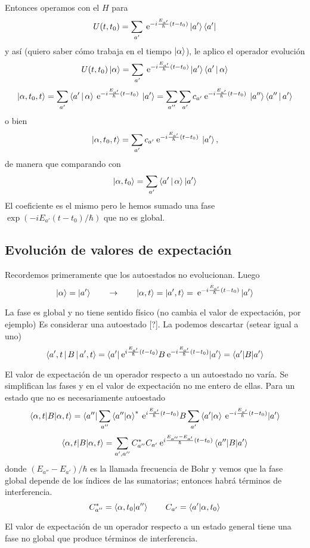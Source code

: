 \documentclass[10pt,oneside]{CBFT_book}
\begin{document}
Entonces operamos con el $H$ para 
\[
	U(t,t_0) = \sum_{a'} \:\mathrm{e}^{-i\frac{E_{a'}}{\hbar}(t-t_0)}\Ket{a'}\Bra{a'}
\]
y así (quiero saber cómo trabaja en el tiempo $\Ket{\alpha}$), le aplico el operador
evolución
\[
	U(t,t_0)\Ket{\alpha} = \sum_{a'} 
	\:\mathrm{e}^{-i\frac{E_{a'}}{\hbar}(t-t_0)}\Ket{a'}\Braket{a'|\alpha}
\]
\[
	\Ket{\alpha,t_0,t} = \sum_{a'} \Braket{a'|\alpha}
	\:\mathrm{e}^{-i\frac{E_{a'}}{\hbar}(t-t_0)} \: \Ket{a'} =
	\sum_{a''} \sum_{a'} c_{a'} \:\mathrm{e}^{-i\frac{E_{a'}}{\hbar}(t-t_0)} \: 
	\Ket{a''}\Braket{a''|a'}
\]
o bien
\[
	\Ket{\alpha,t_0,t} = \sum_{a'} 
	c_{a'} \:\mathrm{e}^{-i\frac{E_{a'}}{\hbar}(t-t_0)} \: \Ket{a'},
\]
de manera que comparando con 
\[
	\Ket{\alpha,t_0} = \sum_{a'} \Braket{a'|\alpha} \Ket{a'}
\]
El coeficiente es el mismo pero le hemos sumado una fase 
$\exp(-iE_{a'}(t-t_0)/\hbar)$ que no es global.

\subsection{Evolución de valores de expectación}

Recordemos primeramente que los autoestados no evolucionan. Luego 
\[
	\Ket{\alpha} = \Ket{a'} 
	\qquad \to \qquad 
	\Ket{\alpha,t} = \Ket{a',t} =  
	\:\mathrm{e}^{-i\frac{E_{a'}}{\hbar}(t-t_0)} \Ket{a'}
\]

La fase es global y no tiene sentido físico (no cambia el valor de expectación, por ejemplo)
Es considerar una autoestado [?]. La podemos descartar (setear igual a uno)
\[
	\Braket{a',t|B|a',t} = 
	\braket{a'|\:\mathrm{e}^{i\frac{E_{a'}}{\hbar}(t-t_0)}B 
	\:\mathrm{e}^{-i\frac{E_{a'}}{\hbar}(t-t_0)}|a'} = \braket{a'|B|a'}
\]

El valor de expectación de un operador respecto a un autoestado no varía.
Se simplifican las fases y en el valor de expectación no me entero de ellas.
Para un estado que no es necesariamente autoestado
\[
	\braket{\alpha,t|B|\alpha,t} =
	\braket{a''|\sum_{a''} \braket{a''|\alpha}^*\:\mathrm{e}^{i\frac{E_{a'}}{\hbar}(t-t_0)} B 
	\sum_{a'} \braket{a'|\alpha} \:\mathrm{e}^{-i\frac{E_{a'}}{\hbar}(t-t_0)}|a'}
\]
\[
	\braket{\alpha,t|B|\alpha,t} = \sum_{a',a''} C_{a''}^* C_{a'} 
	\:\mathrm{e}^{i\frac{E_{a''}-E_{a'}}{\hbar}(t-t_0)} \braket{a''|  B |a'}
\]
donde $(E_{a''}-E_{a'})/\hbar$ es la llamada frecuencia de Bohr y vemos que la fase
global depende de los índices de las sumatorias; entonces habrá términos de interferencia.
\[
	C_{a''}^* = \braket{\alpha,t_0|a''} \qquad C_{a'} = \braket{a'| \alpha,t_0}  
\]

El valor de expectación de un operador respecto a un estado general tiene una fase no global 
que produce términos de interferencia.
\end{document}
